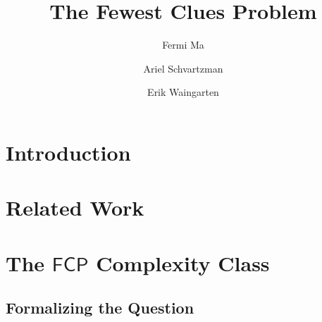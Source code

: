 \documentclass[runningheads,a4paper]{llncs}
\begin{document}
\mainmatter  %

\title{The Fewest Clues Problem}


%
%
\author{Fermi Ma \and Ariel Schvartzman \and Erik Waingarten}
%


%
%

\maketitle

\section{Introduction}
\label{sec:introduction}

\section{Related Work}
\label{sec:relatedwork}

\section{The $\mathsf{FCP}$ Complexity Class}
\label{sec:complexityclass}

\subsection{Formalizing the Question}
\end{document}
